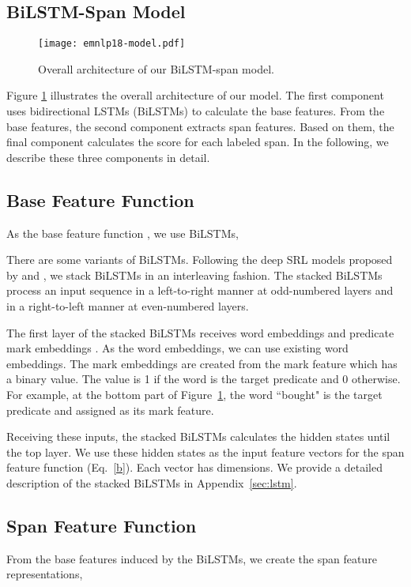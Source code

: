 \documentclass[11pt,a4paper]{article}
\begin{document}
\subsection{BiLSTM-Span Model}
\label{sec:bilstm}
\begin{figure}[t]
  \begin{center}
   \texttt{[image: emnlp18-model.pdf]}
  \caption{Overall architecture of our BiLSTM-span model.}
  \label{fig:model}
  \end{center}
\end{figure}

Figure \ref{fig:model} illustrates the overall architecture of our model.
The first component  uses bidirectional LSTMs (BiLSTMs) \cite{schuster:97,graves:05,graves:13} to calculate the base features.
From the base features, the second component  extracts span features.
Based on them, the final component  calculates the score for each labeled span.
In the following, we describe these three components in detail. 

\subsection*{Base Feature Function}
As the base feature function , we use BiLSTMs,


\noindent
There are some variants of BiLSTMs.
Following the deep SRL models proposed by  and , we stack BiLSTMs in an interleaving fashion.
The stacked BiLSTMs process an input sequence in a left-to-right manner at odd-numbered layers and in a right-to-left manner at even-numbered layers.

The first layer of the stacked BiLSTMs receives word embeddings  and predicate mark embeddings .
As the word embeddings, we can use existing word embeddings.
The mark embeddings are created from the mark feature which has a binary value.
The value is 1 if the word is the target predicate and 0 otherwise.
For example, at the bottom part of Figure~\ref{fig:model}, the word ``bought" is the target predicate and assigned  as its mark feature.

Receiving these inputs, the stacked BiLSTMs calculates the hidden states until the top layer.
We use these hidden states as the input feature vectors  for the span feature function  (Eq.~\ref{b}).
Each vector  has  dimensions.
We provide a detailed description of the stacked BiLSTMs in Appendix~\ref{sec:lstm}.

\subsection*{Span Feature Function}
From the base features induced by the BiLSTMs, we create the span feature representations,
\end{document}
